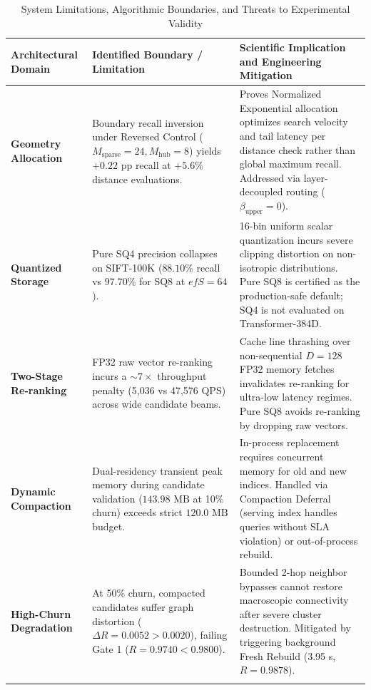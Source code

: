\begin{table}[t]
\centering
\caption{System Limitations, Algorithmic Boundaries, and Threats to Experimental Validity}
\label{tab:limitations_validity}
\scriptsize
\begin{tabular}{p{3.2cm}p{5.5cm}p{7.5cm}}
\toprule
\textbf{Architectural Domain} & \textbf{Identified Boundary / Limitation} & \textbf{Scientific Implication and Engineering Mitigation} \\
\midrule
\textbf{Geometry Allocation} & Boundary recall inversion under Reversed Control ($M_{\text{sparse}}=24, M_{\text{hub}}=8$) yields $+0.22\text{ pp}$ recall at $+5.6\%$ distance evaluations. & Proves Normalized Exponential allocation optimizes search velocity and tail latency per distance check rather than global maximum recall. Addressed via layer-decoupled routing ($\beta_{\text{upper}}=0$). \\
\addlinespace
\textbf{Quantized Storage} & Pure SQ4 precision collapses on SIFT-100K ($88.10\%$ recall vs $97.70\%$ for SQ8 at $efS=64$). & 16-bin uniform scalar quantization incurs severe clipping distortion on non-isotropic distributions. Pure SQ8 is certified as the production-safe default; SQ4 is not evaluated on Transformer-384D. \\
\addlinespace
\textbf{Two-Stage Re-ranking} & FP32 raw vector re-ranking incurs a $\sim 7\times$ throughput penalty (5,036 vs 47,576 QPS) across wide candidate beams. & Cache line thrashing over non-sequential $D=128$ FP32 memory fetches invalidates re-ranking for ultra-low latency regimes. Pure SQ8 avoids re-ranking by dropping raw vectors. \\
\addlinespace
\textbf{Dynamic Compaction} & Dual-residency transient peak memory during candidate validation ($143.98\text{ MB}$ at 10\% churn) exceeds strict $120.0\text{ MB}$ budget. & In-process replacement requires concurrent memory for old and new indices. Handled via Compaction Deferral (serving index handles queries without SLA violation) or out-of-process rebuild. \\
\addlinespace
\textbf{High-Churn Degradation} & At 50\% churn, compacted candidates suffer graph distortion ($\Delta R = 0.0052 > 0.0020$), failing Gate 1 ($R=0.9740 < 0.9800$). & Bounded 2-hop neighbor bypasses cannot restore macroscopic connectivity after severe cluster destruction. Mitigated by triggering background Fresh Rebuild (3.95 s, $R=0.9878$). \\
\addlinespace

\end{tabular}
\end{table}
